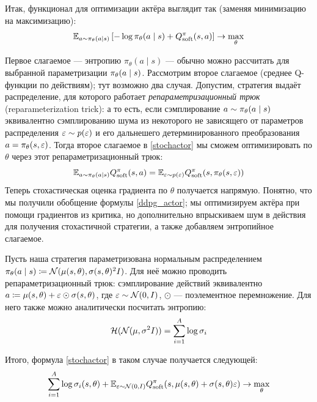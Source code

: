 Итак, функционал для оптимизации актёра выглядит так (заменяя минимизацию на максимизацию):
\begin{equation}\label{stochactor}
\mathbb{E}_{a \sim \pi_\theta(a \mid s)} \left[ -\log \pi_\theta(a \mid s) + Q^\pi_{\mathrm{soft}}(s, a) \right] \to \max_{\theta}
\end{equation}

Первое слагаемое --- энтропию $\pi_\theta(a \mid s)$ --- обычно можно рассчитать для выбранной параметризации $\pi_{\theta}(a \HM\mid s)$. Рассмотрим второе слагаемое (среднее Q-функции по действиям); тут возможно два случая. Допустим, стратегия выдаёт распределение, для которого работает \emph{репараметризационный трюк} (reparameterization trick): а то есть, если сэмплирование $a \HM\sim \pi_\theta(a \mid s)$ эквивалентно сэмплированию шума из некоторого не зависящего от параметров распределения $\varepsilon \sim p(\varepsilon)$ и его дальнешего детерминированного преобразования $a \HM= \pi_{\theta}(s, \eps)$. Тогда второе слагаемое в \eqref{stochactor} мы сможем оптимизировать по $\theta$ через этот репараметризационный трюк:
\begin{equation*}
\mathbb{E}_{a \sim \pi_\theta(a \mid s)} Q^\pi_{\mathrm{soft}}(s, a) = \mathbb{E}_{\varepsilon \sim p(\varepsilon)} Q^\pi_{\mathrm{soft}}(s, \pi_{\theta}(s, \varepsilon))
\end{equation*}
Теперь стохастическая оценка градиента по $\theta$ получается напрямую. Понятно, что мы получили обобщение формулы \eqref{ddpg_actor}; мы оптимизируем актёра при помощи градиентов из критика, но дополнительно впрыскиваем шум в действия для получения стохастичной стратегии, а также добавляем энтропийное слагаемое. 

\begin{exampleBox}[label=ex:gaussianactor_sac]{}
Пусть наша стратегия параметризована нормальным распределением $\pi_\theta(a \mid s) \HM\coloneqq \N(\mu(s, \theta), \sigma(s, \theta)^2I)$. Для неё можно проводить репараметризационный трюк: сэмплирование действий эквивалентно $a \coloneqq \mu(s, \theta) \HM+ \eps \HM\odot \sigma(s, \theta)$, где $\eps \HM\sim \N(0, I)$, $\odot$ --- поэлементное перемножение. Для него также можно аналитически посчитать энтропию:
$$\mathcal{H}(\mathcal{N}(\mu, \sigma^2I)) = \sum_{i=1}^{A} \log \sigma_i$$

Итого, формула \eqref{stochactor} в таком случае получается следующей:
$$\sum_{i=1}^A\log \sigma_i(s, \theta) + \mathbb{E}_{\varepsilon \sim \mathcal{N}(0, I)} Q^\pi_{\mathrm{soft}}(s, \mu(s, \theta) + \sigma(s, \theta) \varepsilon) \to \max_\theta $$
\end{exampleBox}

